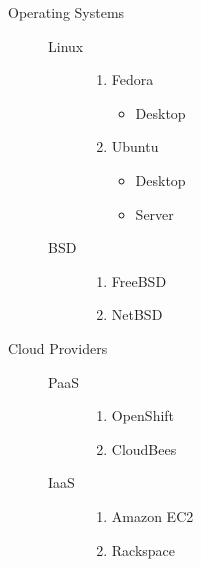 \begin{description}
\item[Operating Systems]\begin{description}
\item[Linux]\begin{enumerate}
\item{Fedora}
\begin{itemize}
\item Desktop
\end{itemize}
\item{Ubuntu}
\begin{itemize}
\item Desktop
\item Server
\end{itemize}
\end{enumerate}
\item[BSD]\begin{enumerate}
\item{FreeBSD}
\item{NetBSD}
\end{enumerate}
\end{description}
\item[Cloud Providers]\begin{description}
\item[PaaS]\begin{enumerate}
\item{OpenShift}
\item{CloudBees}
\end{enumerate}
\item[IaaS]\begin{enumerate}
\item{Amazon EC2}
\item{Rackspace}
\end{enumerate}
\end{description}
\end{description}
